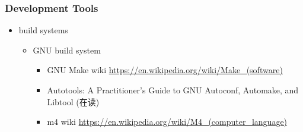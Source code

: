 \documentclass{article}
\begin{document}
\subsubsection{Development Tools}
%
\begin{itemize}
    \item build systems
        \begin{itemize}
            \item GNU build system
                \begin{itemize}
                    \item GNU Make wiki \url{https://en.wikipedia.org/wiki/Make_(software)}
                    \item Autotools: A Practitioner's Guide to GNU Autoconf, Automake, and Libtool (在读)
                    \item m4 wiki \url{https://en.wikipedia.org/wiki/M4_(computer_language)}
                \end{itemize}
        \end{itemize}
\end{itemize}
%
\end{document}
